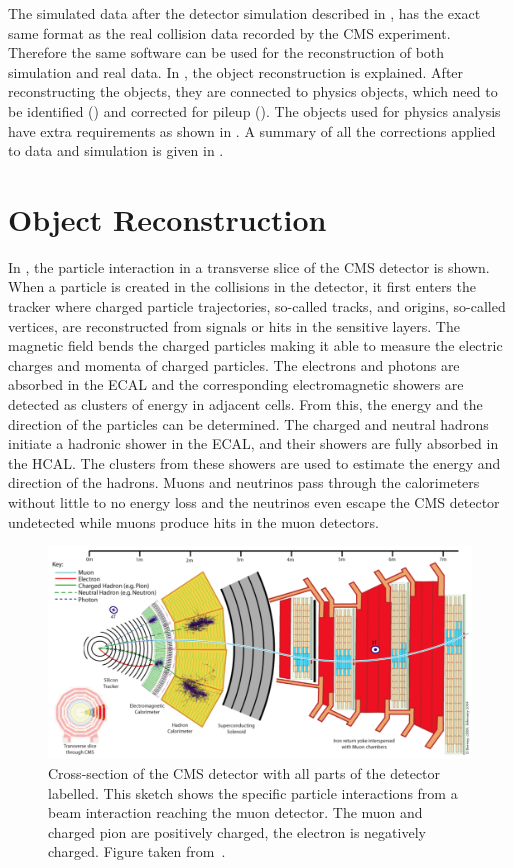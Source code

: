 The simulated data after the detector simulation described in , has the exact same format as the real collision data recorded by the CMS experiment. Therefore the same software can be used for the reconstruction of both simulation and real data. In , the object reconstruction is explained. After reconstructing the objects, they are connected to physics objects, which need to be identified () and corrected for pileup (). The objects used for physics analysis have extra requirements as shown in . A summary of all the corrections applied to data and simulation is given in .

\section{Object Reconstruction}
\label{sec:reco}
In , the particle interaction in a transverse slice of the CMS detector is shown. When a particle is created in the collisions in the detector, it first enters the tracker where charged particle trajectories, so-called tracks, and origins, so-called vertices, are reconstructed from signals or hits in the sensitive layers. The  magnetic field bends the charged particles making it able to measure the electric charges and momenta of charged particles. The electrons and photons are absorbed in the ECAL and the corresponding electromagnetic showers are detected as clusters of energy in adjacent cells. From this, the energy and the direction of the particles can be determined. The charged and neutral hadrons initiate a hadronic shower in the ECAL, and their showers are fully absorbed in the HCAL. The clusters from these showers are used to estimate the energy and direction of the hadrons. Muons and neutrinos pass through the calorimeters without little to no energy loss and the neutrinos even escape the CMS detector undetected while muons produce hits in the muon detectors. 
\begin{landscape}
\begin{figure}
	\centering
	\includegraphics[width=1.\linewidth]{4_EventRecoSelect/Figures/transversecms}
	\caption{Cross-section of the CMS detector with all parts of the detector labelled. This sketch shows the specific particle interactions from a beam interaction reaching the muon detector. The muon and charged pion are positively charged, the electron is negatively charged. Figure taken from~\cite{CMS-PRF-14-001}. }
	\label{fig:transversecms}
\end{figure}
\end{landscape}
